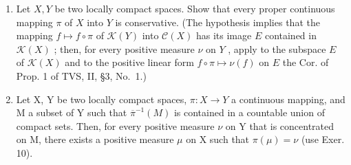 \begin{enumerate}
\def\labelenumi{\arabic{enumi})}
\setcounter{enumi}{9}
\item
  Let \(X, Y\) be two locally compact spaces. Show that every proper continuous mapping \(\pi\) of \(X\) into \(Y\) is conservative. (The hypothesis implies that the mapping \(f \mapsto f \circ \pi\) of \(\mathcal{K}(Y)\) into \(\mathcal{C}(X)\) has its image \(E\) contained in \(\mathcal{K}(X)\) ; then, for every positive measure \(\nu\) on \(Y\) , apply to the subspace \(E\) of \(\mathcal{K}(X)\) and to the positive linear form \(f \circ \pi \mapsto \nu(f)\) on \(E\) the Cor. of Prop. 1 of TVS, II, §3, No.~1.)
\item
  Let X, Y be two locally compact spaces, \(\pi: X \to Y\) a continuous mapping, and M a subset of Y such that \(\overline{\pi}^{-1}(M)\) is contained in a countable union of compact sets. Then, for every positive measure \(\nu\) on Y that is concentrated on M, there exists a positive measure \(\mu\) on X such that \(\pi(\mu) = \nu\) (use Exer. 10).
\end{enumerate}
